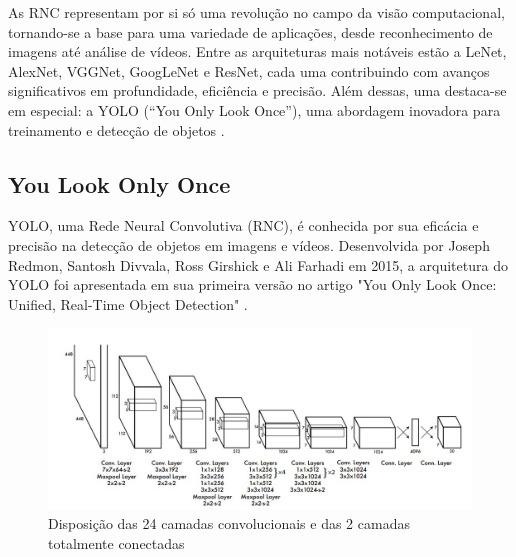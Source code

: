As RNC representam por si só uma revolução no campo da visão computacional, tornando-se a base para uma variedade de aplicações, desde reconhecimento de imagens até análise de vídeos. Entre as arquiteturas mais notáveis estão a LeNet, AlexNet, VGGNet, GoogLeNet e ResNet, cada uma contribuindo com avanços significativos em profundidade, eficiência e precisão. Além dessas, uma destaca-se em especial: a YOLO (“You Only Look Once”), uma abordagem inovadora para treinamento e detecção de objetos \cite{carboni2021sistema}.

\subsection{You Look Only Once}
\label{sec:yolo}

YOLO, uma Rede Neural Convolutiva (RNC), é conhecida por sua eficácia e precisão na detecção de objetos em imagens e vídeos. Desenvolvida por Joseph Redmon, Santosh Divvala, Ross Girshick e Ali Farhadi em 2015, a arquitetura do YOLO foi apresentada em sua primeira versão no artigo "You Only Look Once: Unified, Real-Time Object Detection" \cite{redmon2016youlookonce}.
\begin{figure}[!h]
    \center
    \begin{minipage}{1\linewidth}
    \center
    \captionsetup{justification=centering,margin=0.5cm,font=small}
    \includegraphics[width=1\linewidth]{img/cap2/RNC-YOLO.jpeg}
    \caption{ Disposição das 24 camadas convolucionais e das 2 camadas totalmente conectadas \cite{redmon2016youlookonce}} \label{fig:rnc-yolo}
    \end{minipage}
\end{figure}

